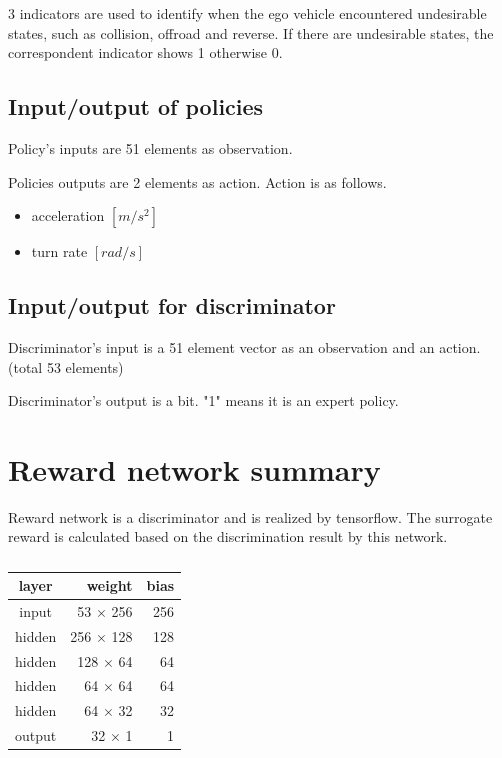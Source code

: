 3 indicators are used to identify when the ego vehicle encountered undesirable states, such as collision, offroad and reverse.
If there are undesirable states, the correspondent  indicator shows 1 otherwise 0.





\subsection{Input/output of policies}

Policy's inputs are 51 elements as observation.

Policies outputs are 2 elements as action.
Action is as follows.

\begin{itemize}
\item acceleration $[m/s^2]$
\item turn rate $[rad/s]$
\end{itemize}


\subsection{Input/output for discriminator}

Discriminator's input is a 51 element vector as an observation and an action. (total 53 elements)

Discriminator's output is a bit. "1" means it is an expert policy.





\section{Reward network summary}

Reward network is a discriminator and is realized by tensorflow. The surrogate reward is calculated based on the discrimination result by this network.

\begin{table}[H]
\centering
\begin{tabular}{|c|r|r|}
\hline 
layer  & weight   & bias \\ \hline \hline
input  & 53 $\times$ 256 & 256  \\
hidden & 256 $\times$ 128 & 128 \\ 
hidden & 128 $\times$ 64 & 64 \\ 
hidden & 64 $\times$ 64 & 64 \\ 
hidden & 64 $\times$ 32 & 32 \\ 
output & 32 $\times$ 1 & 1 \\ 
\hline
\end{tabular} 
\caption{}
\label{tab:reward_network}
\end{table}


